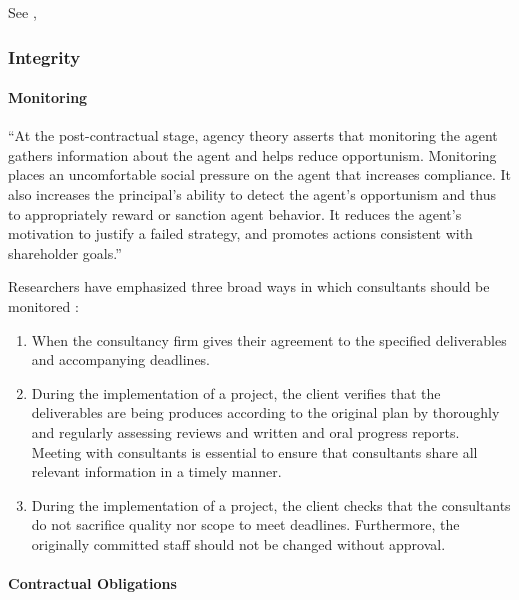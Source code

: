 \documentclass[12pt]{article}
\providecommand{\tightlist}{%
  \setlength{\itemsep}{0pt}\setlength{\parskip}{0pt}}
\begin{document}
See \citep[ 76-77]{armbruster2006},

\hypertarget{integrity}{%
\subsubsection{Integrity}\label{integrity}}

\hypertarget{monitoring}{%
\paragraph{Monitoring}\label{monitoring}}

``At the post-contractual stage, agency theory asserts that monitoring
the agent gathers information about the agent and helps reduce
opportunism. Monitoring places an uncomfortable social pressure on the
agent that increases compliance. It also increases the principal's
ability to detect the agent's opportunism and thus to appropriately
reward or sanction agent behavior. It reduces the agent's motivation to
justify a failed strategy, and promotes actions consistent with
shareholder goals.'' \citep[ 13]{basu2011}

Researchers have emphasized three broad ways in which consultants should
be monitored \citep[ 15]{basu2011}:

\begin{enumerate}
\def\labelenumi{\arabic{enumi}.}
\tightlist
\item
  When the consultancy firm gives their agreement to the specified
  deliverables and accompanying deadlines.
\item
  During the implementation of a project, the client verifies that the
  deliverables are being produces according to the original plan by
  thoroughly and regularly assessing reviews and written and oral
  progress reports. Meeting with consultants is essential to ensure that
  consultants share all relevant information in a timely manner.
\item
  During the implementation of a project, the client checks that the
  consultants do not sacrifice quality nor scope to meet deadlines.
  Furthermore, the originally committed staff should not be changed
  without approval.
\end{enumerate}

\hypertarget{contractual-obligations}{%
\paragraph{Contractual Obligations}\label{contractual-obligations}}
\end{document}
